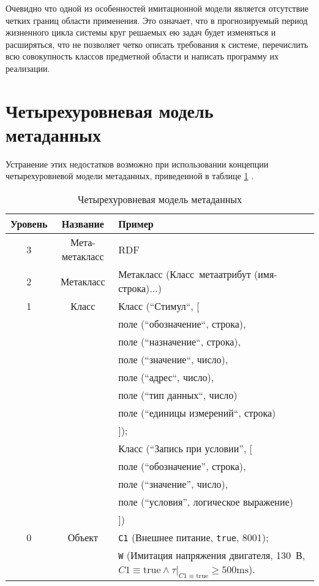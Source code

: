 Очевидно что одной из особенностей имитационной модели является отсутствие четких границ области применения.
Это означает, что в прогнозируемый период жизненного цикла системы круг решаемых ею задач будет изменяться и расширяться,
что не позволяет четко описать требования к системе, перечислить всю совокупность классов предметной области и
написать программу их реализации.

\section{Четырехуровневая модель метаданных}
Устранение этих недостатков возможно при использовании концепции четырехуровневой модели метаданных, приведенной
в таблице \ref{tbl:meta_data_levels} \cite{journal:vestnik_spbgu:ivakin,book:gost:56272,w3c:rdf:lassila}.
\begin{longtable}{|c|c|p{}|}
    \caption{Четырехуровневая модель метаданных}\label{tbl:meta_data_levels} \\
    \hline\textbf{Уровень} & \textbf{Название} & \textbf{Пример} \\\hline\endhead
    3 & Мета-метакласс & RDF \\\hline
    2 & Метакласс & Метакласс (Класс~метаатрибут (имя-строка)...) \\\hline
    1 & Класс & Класс (``Стимул``, [\\
                &&\hspace{5mm}поле (``обозначение``, строка), \\
                &&\hspace{5mm}поле (``назначение``, строка), \\
                &&\hspace{5mm}поле (``значение``, число),\\
                &&\hspace{5mm}поле (``адрес``, число),\\
                &&\hspace{5mm}поле (``тип данных``, число)\\
                &&\hspace{5mm}поле (``единицы измерений``, строка)\\
            &&]);\\
            &&Класс (``Запись при условии'', [\\
                &&\hspace{5mm}поле (``обозначение'', строка),\\
                &&\hspace{5mm}поле (``значение'', число),\\
                &&\hspace{5mm}поле (``условия'', логическое выражение)\\
            &&])\\\hline
    0 & Объект & 
        \texttt{C1} (Внешнее питание, \texttt{true}, 8001); \\
        &&\texttt{W} (Имитация напряжения двигателя, 130~В, $C1 \equiv \mbox{true} \wedge \tau|_{C1\equiv\mbox{true}} \ge 500\mbox{ms}$).
        \\\hline
\end{longtable}
